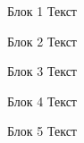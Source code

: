 \begin{block}{Блок 1}
  Текст
  \vspace{10cm}
\end{block}
\begin{block}{Блок 2}
  Текст
  \vspace{10cm}
\end{block}
\begin{block}{Блок 3}
  Текст
  \vspace{10cm}
\end{block}
\begin{block}{Блок 4}
  Текст
  \vspace{10cm}
\end{block}
\begin{block}{Блок 5}
  Текст
  \vspace{10cm}
\end{block}

